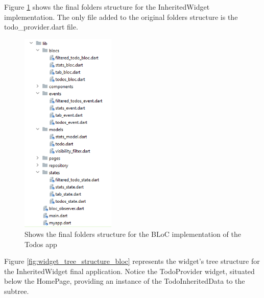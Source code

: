 Figure \ref{fig:struttura_cartelle_bloc} shows the final folders structure for the InheritedWidget implementation. The only  file added to the original folders structure is the todo\_provider.dart file.

\begin{figure}[H]
    \centering
    \includegraphics[width=0.4\textwidth]{Images/struttura_cartelle_bloc.png}
    \caption{Shows the final folders structure for the BLoC implementation of the Todos app}
    \label{fig:struttura_cartelle_bloc}
\end{figure}
Figure \ref{fig:widget_tree_structure_bloc} represents the widget's tree structure for the InheritedWidget final application. Notice the TodoProvider widget, situated below the HomePage, providing an instance of the TodoInheritedData to the subtree.

